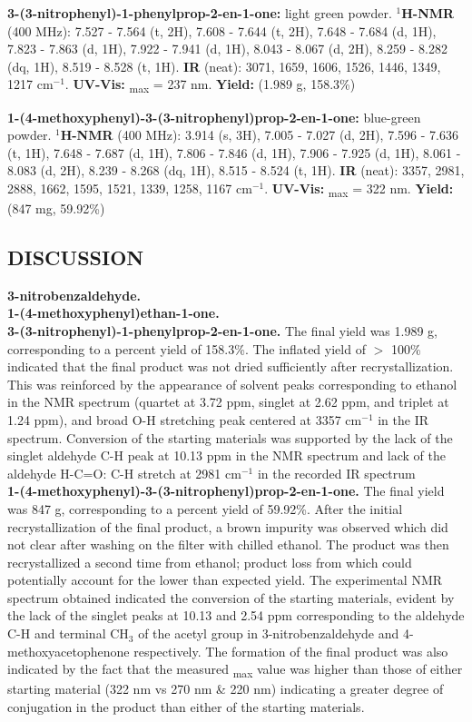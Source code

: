 \documentclass[11pt]{article}
\let\bf\textbf
\begin{document}
\noindent\bf{3-(3-nitrophenyl)-1-phenylprop-2-en-1-one:} light green powder. \bf{$^1$H-NMR} (400 MHz): \textdelta\hspace{0mm} 7.527 - 7.564 (t, 2H), 7.608 - 7.644 (t, 2H), 7.648 - 7.684 (d, 1H), 7.823 - 7.863 (d, 1H), 7.922 - 7.941 (d, 1H), 8.043 - 8.067 (d, 2H), 8.259 - 8.282 (dq, 1H), 8.519 - 8.528 (t, 1H). \bf{IR} (neat): 3071, 1659, 1606, 1526, 1446, 1349, 1217 cm$^{-1}$. \bf{UV-Vis:} \textlambda\textsubscript{max} = 237 nm. \bf{Yield:} (1.989 g, 158.3\%)

\noindent\bf{1-(4-methoxyphenyl)-3-(3-nitrophenyl)prop-2-en-1-one:} blue-green powder. \bf{$^1$H-NMR} (400 MHz): \textdelta\hspace{0mm} 3.914 (s, 3H), 7.005 - 7.027 (d, 2H), 7.596 - 7.636 (t, 1H), 7.648 - 7.687 (d, 1H), 7.806 - 7.846 (d, 1H), 7.906 - 7.925 (d, 1H), 8.061 - 8.083 (d, 2H), 8.239 - 8.268 (dq, 1H), 8.515 - 8.524 (t, 1H). \bf{IR} (neat): 3357, 2981, 2888, 1662, 1595, 1521, 1339, 1258, 1167 cm$^{-1}$. \bf{UV-Vis:} \textlambda\textsubscript{max} = 322 nm. \bf{Yield:} (847 mg, 59.92\%)

\subsection*{DISCUSSION}
\bf{3-nitrobenzaldehyde.} \\
\bf{1-(4-methoxyphenyl)ethan-1-one.} \\
\bf{3-(3-nitrophenyl)-1-phenylprop-2-en-1-one.} The final yield was 1.989 g, corresponding to a percent yield of 158.3\%. The inflated yield of $>$ 100\% indicated that the final product was not dried sufficiently after recrystallization. This was reinforced by the appearance of solvent peaks corresponding to ethanol in the NMR spectrum (quartet at 3.72 ppm, singlet at 2.62 ppm, and triplet at 1.24 ppm), and broad O-H stretching peak centered at 3357 cm$^{-1}$ in the IR spectrum. Conversion of the starting materials was supported by the lack of the singlet aldehyde C-H peak at 10.13 ppm in the NMR spectrum and lack of the aldehyde H-C=O: C-H stretch at 2981 cm$^{-1}$ in the recorded IR spectrum \\
\bf{1-(4-methoxyphenyl)-3-(3-nitrophenyl)prop-2-en-1-one.} The final yield was 847 g, corresponding to a percent yield of 59.92\%. After the initial recrystallization of the final product, a brown impurity was observed which did not clear after washing on the filter with chilled ethanol. The product was then recrystallized a second time from ethanol; product loss from which could potentially account for the lower than expected yield. The experimental NMR spectrum obtained indicated the conversion of the starting materials, evident by the lack of the singlet peaks at 10.13 and 2.54 ppm corresponding to the aldehyde C-H and terminal CH$_3$ of the acetyl group in 3-nitrobenzaldehyde and 4-methoxyacetophenone respectively. The formation of the final product was also indicated by the fact that the measured \textlambda\textsubscript{max} value was higher than those of either starting material (322 nm vs 270 nm \& 220 nm) indicating a greater degree of conjugation in the product than either of the starting materials.
\end{document}
